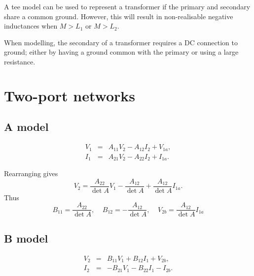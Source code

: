 \documentclass[a4paper, 12pt]{article}
\newcommand{\bigspace}{\;\;\;\;}
\begin{document}
A tee model can be used to represent a transformer if the primary and
secondary share a common ground.  However, this will result in
non-realisable negative inductances when $M > L_1$ or $M > L_2$.


When modelling, the secondary of a transformer requires a DC
connection to ground; either by having a ground common with the
primary or using a large resistance.



\section{Two-port networks}


\subsection{A model}

\begin{eqnarray}
  V_1 & = & A_{11} V_2 - A_{12} I_2 + V_{1a}, \\
  I_1 & = & A_{21} V_2 - A_{22} I_2 + I_{1a}.
\end{eqnarray}

Rearranging gives
%
\begin{equation}
 V_2 = \frac{A_{22}}{\det{A}} V_1 - \frac{A_{12}}{\det{A}} + \frac{A_{12}}{\det{A}} I_{1a}. 
\end{equation}
%
Thus
%
\begin{equation}
 B_{11} = \frac{A_{22}}{\det{A}}, \bigspace B_{12} = -\frac{A_{12}}{\det{A}}, \bigspace V_{2b} = \frac{A_{12}}{\det{A}} I_{1a} 
\end{equation}


\subsection{B model}

\begin{eqnarray}
\label{eqn:BV2}
  V_2 & = & B_{11} V_1 + B_{12} I_1 + V_{2b}, \\
  I_2 & = & -B_{21} V_1 - B_{22} I_1 - I_{2b}.
\label{eqn:BI2}
\end{eqnarray}
\end{document}
